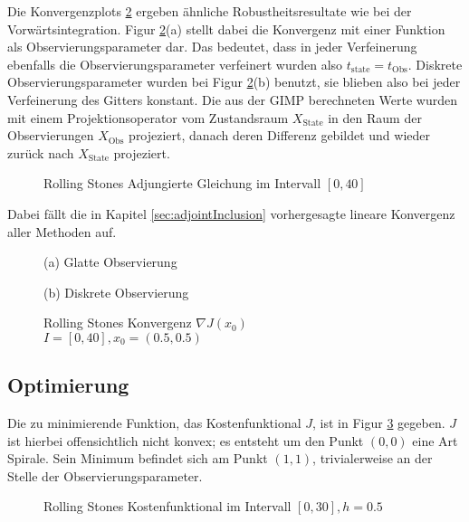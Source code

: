 Die Konvergenzplots \ref{fig:rollingStonesAdjoint} ergeben ähnliche Robustheitsresultate wie bei der Vorwärtsintegration. Figur \ref{fig:rollingStonesAdjoint}(a) stellt dabei die Konvergenz mit einer Funktion als Observierungsparameter dar. Das bedeutet, dass in jeder Verfeinerung ebenfalls die Observierungsparameter verfeinert wurden also $t_{\text{state}} = t_{\text{Obs}}$. Diskrete Observierungsparameter wurden bei Figur \ref{fig:rollingStonesAdjoint}(b) benutzt, sie blieben also bei jeder Verfeinerung des Gitters konstant. Die aus der GIMP berechneten Werte wurden mit einem Projektionsoperator vom Zustandsraum $X_{\text{State}}$ in den Raum der Observierungen $X_{\text{Obs}}$ projeziert, danach deren Differenz gebildet und wieder zurück nach $X_{\text{State}}$ projeziert.
\begin{figure}[H]
\centering

\caption{Rolling Stones Adjungierte Gleichung im Intervall $[0,40]$}
\label{fig:rolling_adjoint_eq}
\end{figure}
Dabei fällt die in Kapitel \ref{sec:adjointInclusion} vorhergesagte lineare Konvergenz aller Methoden auf.


\begin{figure}[H]
\footnotesize 
\centering
\begin{minipage}[b]{0.49\linewidth}

\caption*{(a) Glatte Observierung}
\end{minipage}
\begin{minipage}[b]{0.49\linewidth}

\caption*{(b) Diskrete Observierung}
\label{fig:rollingStonesAdjointDiscrete}
\end{minipage}
\caption{Rolling Stones Konvergenz $\nabla J(x_0)$\\ $I=[0,40],x_0=(0.5,0.5)$}
\label{fig:rollingStonesAdjoint}
\end{figure}

\subsection{Optimierung}
Die zu minimierende Funktion, das Kostenfunktional $J$, ist in Figur \ref{fig:rolling_costfunctional} gegeben. $J$ ist hierbei offensichtlich nicht konvex; es entsteht um den Punkt $(0,0)$ eine Art Spirale. Sein Minimum befindet sich am Punkt $(1,1)$, trivialerweise an der Stelle der Observierungsparameter. 
\begin{figure}[H]
\centering

\caption{Rolling Stones Kostenfunktional im Intervall $[0,30],h=0.5$}
\label{fig:rolling_costfunctional}
\end{figure}

